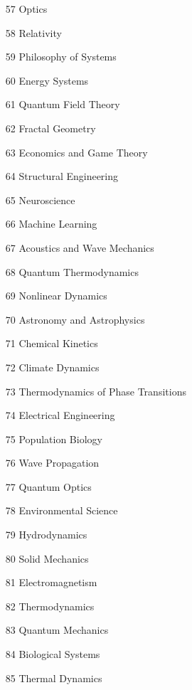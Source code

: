 \documentclass[11pt,a4paper]{article}
\begin{document}
\begin{itemize}
    \item[57] Optics 
    \item[58] Relativity  %
    \item[59] Philosophy of Systems 
    \item[60] Energy Systems  %
    \item[61] Quantum Field Theory  %
    \item[62] Fractal Geometry 
    \item[63] Economics and Game Theory 
    \item[64] Structural Engineering 
    \item[65] Neuroscience  %
    \item[66] Machine Learning  %
    \item[67] Acoustics and Wave Mechanics 
    \item[68] Quantum Thermodynamics  %
    \item[69] Nonlinear Dynamics 
    \item[70] Astronomy and Astrophysics  %
    \item[71] Chemical Kinetics 
    \item[72] Climate Dynamics 
    \item[73] Thermodynamics of Phase Transitions 
    \item[74] Electrical Engineering  %
    \item[75] Population Biology 
    \item[76] Wave Propagation 
    \item[77] Quantum Optics 
    \item[78] Environmental Science 
    \item[79] Hydrodynamics 
    \item[80] Solid Mechanics 
    \item[81] Electromagnetism 
    \item[82] Thermodynamics  %
    \item[83] Quantum Mechanics  %
    \item[84] Biological Systems 
    \item[85] Thermal Dynamics 

\end{itemize}
\end{document}
